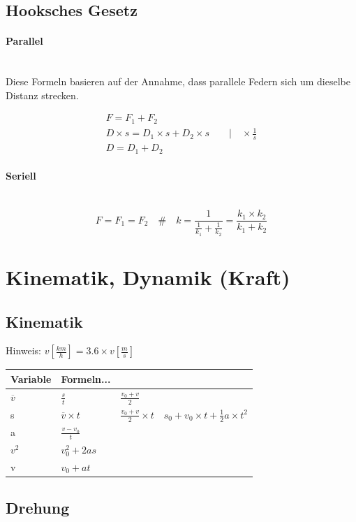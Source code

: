 \documentclass[a4paper,twoside,10pt]{article}
\newcommand{\lbparagraph}[1]{\paragraph{#1}\mbox{}\\}
\newcommand{\eqsp}[1]{\quad\#\quad}
\begin{document}
\subsection{Hooksches Gesetz}

\lbparagraph{Parallel}

Diese Formeln basieren auf der Annahme, dass parallele Federn sich um dieselbe Distanz strecken.

\begin{gather}
    F = F_1 + F_2
    \\
    D \times s = D_1 \times s + D_2 \times s \qquad | \quad \times\frac{1}{s}
    \\
    D = D_1 + D_2
\end{gather}

\lbparagraph{Seriell}

\begin{equation}
    F = F_1 = F_2
    \eqsp{}
    k = \frac{1}{\frac{1}{k_1} + \frac{1}{k_2}} = \frac{k_1 \times k_2}{k_1 + k_2}
\end{equation}
    
\section{Kinematik, Dynamik (Kraft)}

\subsection{Kinematik}

Hinweis: $v[\frac{km}{h}] = 3.6 \times v[\frac{m}{s}]$ \newline

\begin{tabular}{l|l|l|l}
    Variable & Formeln... & & \\
    \hline
    $\overline{v}$ & $\frac{s}{t}$ & $\frac{v_0 + v}{2}$ & \\
    \hline
    s & $\overline{v} \times t$ & $\frac{v_0 + v}{2} \times t$ & $s_0 + v_0 \times t + \frac{1}{2}a \times t^2$ \\
    \hline
    a & $\frac{v - v_0}{t}$ & & \\
    \hline
    $v^2$ & $v_0^2 + 2as$ & & \\
    \hline
    v & $v_0 + at$ & &
\end{tabular}

\subsection{Drehung}
\end{document}
